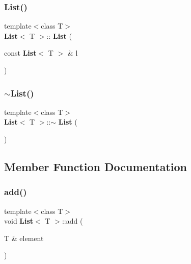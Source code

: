 \mbox{\label{class_list_a3f8cda0e5a9b4912759e782994e57735}} 
\subsubsection{List()\hspace{0.1cm}{\footnotesize\ttfamily [2/2]}}
{\footnotesize\ttfamily template$<$class T$>$ \\
\textbf{ List}$<$ T $>$\+::\textbf{ List} (\begin{DoxyParamCaption}\item[{const \textbf{ List}$<$ T $>$ \&}]{l }\end{DoxyParamCaption})\hspace{0.3cm}{\ttfamily [inline]}}

\mbox{\label{class_list_a2b58189090f6e5ce52939c9195e59e85}} 
\subsubsection{$\sim$\+List()}
{\footnotesize\ttfamily template$<$class T$>$ \\
\textbf{ List}$<$ T $>$\+::$\sim$\textbf{ List} (\begin{DoxyParamCaption}{ }\end{DoxyParamCaption})\hspace{0.3cm}{\ttfamily [inline]}}



\subsection{Member Function Documentation}
\mbox{\label{class_list_a1a6b5ceed2cb6d432c0a5d9114e79e70}} 
\subsubsection{add()}
{\footnotesize\ttfamily template$<$class T$>$ \\
void \textbf{ List}$<$ T $>$\+::add (\begin{DoxyParamCaption}\item[{T \&}]{element }\end{DoxyParamCaption})\hspace{0.3cm}{\ttfamily [inline]}}

\mbox{\label{class_list_a7a74fc01260437fac92355dc8d4e789c}} 
